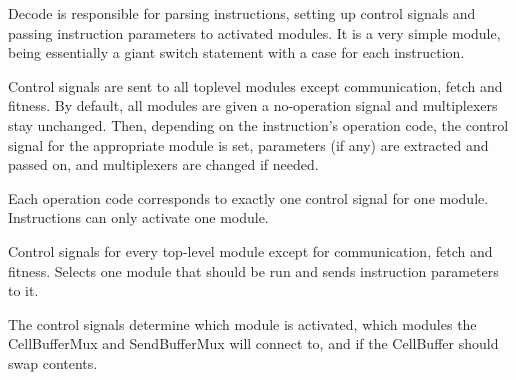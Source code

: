 Decode is responsible for parsing instructions, setting up control signals and passing instruction parameters to activated modules.
It is a very simple module, being essentially a giant switch statement with a case for each instruction.

Control signals are sent to all toplevel modules except communication, fetch and fitness.
By default, all modules are given a no-operation signal and multiplexers stay unchanged.
Then, depending on the instruction's operation code, the control signal for the appropriate module is set, parameters (if any) are extracted and passed on, and multiplexers are changed if needed.

Each operation code corresponds to exactly one control signal for one module.
Instructions can only activate one module.

Control signals for every top-level module except for communication, fetch and fitness.
Selects one module that should be run and sends instruction parameters to it.

The control signals determine which module is activated, which modules the CellBufferMux and SendBufferMux will connect to, and if the CellBuffer should swap contents.










